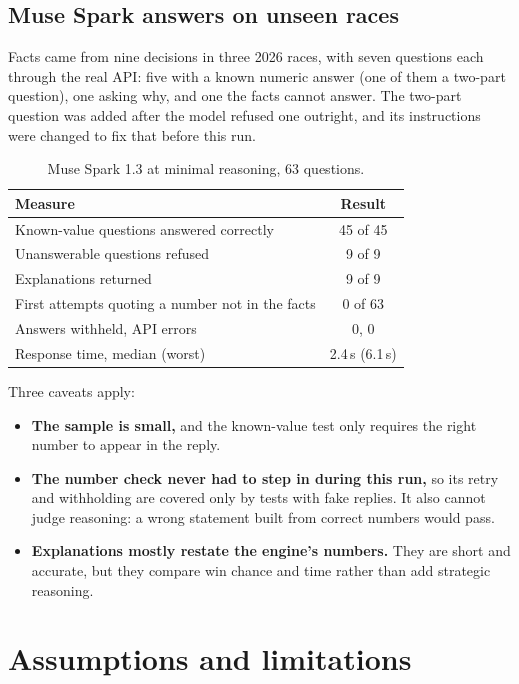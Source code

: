 \documentclass[11pt,a4paper]{article}
\begin{document}
\subsection{Muse Spark answers on unseen races}
Facts came from nine decisions in three 2026 races, with seven questions each through the real API:
five with a known numeric answer (one of them a two-part question), one asking why, and one the
facts cannot answer. The two-part question was added after the model refused one outright, and
its instructions were changed to fix that before this run.

\begin{table}[H]
\centering
\begin{tabular}{@{}lc@{}}
\toprule
Measure & Result \\
\midrule
Known-value questions answered correctly & 45 of 45 \\
Unanswerable questions refused & 9 of 9 \\
Explanations returned & 9 of 9 \\
First attempts quoting a number not in the facts & 0 of 63 \\
Answers withheld, API errors & 0, 0 \\
Response time, median (worst) & 2.4\,s (6.1\,s) \\
\bottomrule
\end{tabular}
\caption{Muse Spark 1.3 at minimal reasoning, 63 questions.}
\end{table}

Three caveats apply:
\begin{itemize}
  \item \textbf{The sample is small,} and the known-value test only requires the right number
        to appear in the reply.
  \item \textbf{The number check never had to step in during this run,} so its retry and
        withholding are covered only by tests with fake replies. It also cannot judge reasoning:
        a wrong statement built from correct numbers would pass.
  \item \textbf{Explanations mostly restate the engine's numbers.} They are short and accurate,
        but they compare win chance and time rather than add strategic reasoning.
\end{itemize}

\section{Assumptions and limitations}
\end{document}
